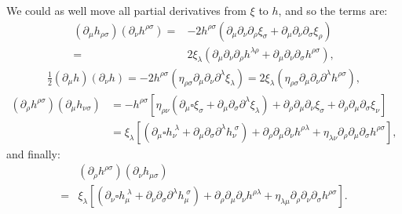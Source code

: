 \documentclass[aps,prd,preprint]{revtex4-1}
\begin{document}
We could as well move all partial derivatives from $\xi$ to $h$, and so the terms are:
\begin{align}
\left( \partial_\mu h_{\rho \sigma} \right) \left( \partial_\nu h^{\rho \sigma} \right)
= & -2 h^{\rho\sigma} \left( \partial_\mu \partial_\nu \partial_\rho \xi_\sigma +
    \partial_\mu \partial_\nu \partial_\sigma \xi_\rho \right) \\
= & 2 \xi_\lambda \left( \partial_\mu \partial_\nu \partial_\rho h^{\lambda\rho} +
  \partial_\mu \partial_\nu \partial_\sigma h^{\rho \sigma} \right), \label{eq:alt-first-term}
\end{align}
\begin{align}
\frac{1}{2} \left( \partial_\mu h \right) \left( \partial_\nu h \right) =
-2 h^{\rho\sigma} \left( \eta_{\rho\sigma} \partial_\mu \partial_\nu \partial^\lambda \xi_\lambda \right)
= 2 \xi_\lambda \left( \eta_{\rho \sigma} \partial_\mu \partial_\nu \partial^\lambda h^{\rho\sigma} \right),
  \label{eq:alt-second-term}
\end{align}
\begin{align}
\left( \partial_\rho h^{\rho \sigma} \right) \left( \partial_\mu h_{\nu \sigma} \right) & =
-h^{\rho \sigma} \left[
  \eta_{\rho \nu} \left( \partial_\mu \square \xi_\sigma +
    \partial_\mu \partial_\sigma \partial^\lambda \xi_\lambda \right) +
    \partial_\rho \partial_\mu \partial_\nu \xi_\sigma +
    \partial_\rho \partial_\mu \partial_\sigma \xi_\nu \right] \\
& = \xi_\lambda \left[
  \left(
    \partial_\mu \square h_\nu^{\; \lambda} +
    \partial_\mu \partial_\sigma \partial^\lambda h_\nu^{\; \sigma}
  \right)
  + \partial_\rho \partial_\mu \partial_\nu h^{\rho\lambda}
  + \eta_{\lambda\nu} \partial_\rho \partial_\mu \partial_\sigma h^{\rho\sigma}
\right], \label{eq:alt-third-term}
\end{align}
and finally:
\begin{align}
& \left( \partial_\rho h^{\rho \sigma} \right) \left( \partial_\nu h_{\mu \sigma} \right) \\
= & \xi_\lambda \left[
  \left(
    \partial_\nu \square h_\mu^{\; \lambda} +
    \partial_\nu \partial_\sigma \partial^\lambda h_\mu^{\; \sigma}
  \right)
  + \partial_\rho \partial_\mu \partial_\nu h^{\rho\lambda}
  + \eta_{\lambda\mu} \partial_\rho \partial_\nu \partial_\sigma h^{\rho\sigma}
\right]. \label{eq:alt-fourth-term}
\end{align}
\end{document}
